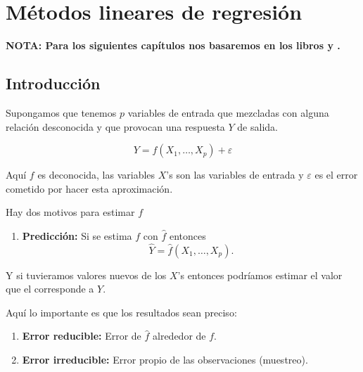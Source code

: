 \documentclass[
  12pt,
]{book}
\providecommand{\tightlist}{%
  \setlength{\itemsep}{0pt}\setlength{\parskip}{0pt}}
\theoremstyle{definition}
\theoremstyle{definition}
\theoremstyle{definition}
\theoremstyle{remark}
\begin{document}
\hypertarget{muxe9todos-lineares-de-regresiuxf3n}{%
\chapter{Métodos lineares de regresión}\label{muxe9todos-lineares-de-regresiuxf3n}}

\textbf{NOTA: Para los siguientes capítulos nos basaremos en los libros \autocite{Hastie2009a} y \autocite{James2013b}.}

\hypertarget{introducciuxf3n-1}{%
\section{Introducción}\label{introducciuxf3n-1}}

Supongamos que tenemos \(p\) variables de entrada que mezcladas con alguna relación desconocida y que provocan una respuesta \(Y\) de salida.

\begin{equation}
Y = f(X_{1},\ldots,X_{p}) + \varepsilon
\label{eq:regresion-general}
\end{equation}

Aquí \(f\) es deconocida, las variables \(X\)'s son las variables de entrada y \(\varepsilon\) es el error cometido por hacer esta aproximación.

Hay dos motivos para estimar \(f\)

\begin{enumerate}
\def\labelenumi{\arabic{enumi}.}
\tightlist
\item
  \textbf{Predicción:} Si se estima \(f\) con \(\hat{f}\) entonces
  \begin{equation*}
  \hat{Y} = \hat{f}(X_{1},\ldots,X_{p}). 
  \end{equation*}
\end{enumerate}

Y si tuvieramos valores nuevos de los \(X\)'s entonces podríamos estimar el valor que el corresponde a \(Y\).

Aquí lo importante es que los resultados sean preciso:

\begin{enumerate}
\def\labelenumi{\alph{enumi}.}
\tightlist
\item
  \textbf{Error reducible:} Error de \(\hat{f}\) alrededor de \(f\).
\item
  \textbf{Error irreducible:} Error propio de las observaciones (muestreo).
\end{enumerate}
\end{document}
